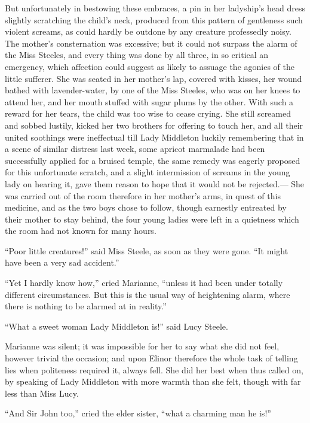 \documentclass{article}
\begin{document}
But unfortunately in bestowing these embraces,
a pin in her ladyship's head dress slightly scratching
the child's neck, produced from this pattern of gentleness
such violent screams, as could hardly be outdone by any
creature professedly noisy.  The mother's consternation
was excessive; but it could not surpass the alarm of the
Miss Steeles, and every thing was done by all three,
in so critical an emergency, which affection could suggest
as likely to assuage the agonies of the little sufferer.
She was seated in her mother's lap, covered with kisses,
her wound bathed with lavender-water, by one of the
Miss Steeles, who was on her knees to attend her,
and her mouth stuffed with sugar plums by the other.
With such a reward for her tears, the child was too wise
to cease crying.  She still screamed and sobbed lustily,
kicked her two brothers for offering to touch her, and all
their united soothings were ineffectual till Lady Middleton
luckily remembering that in a scene of similar distress
last week, some apricot marmalade had been successfully
applied for a bruised temple, the same remedy was eagerly
proposed for this unfortunate scratch, and a slight
intermission of screams in the young lady on hearing it,
gave them reason to hope that it would not be rejected.---%
She was carried out of the room therefore in her
mother's arms, in quest of this medicine, and as the
two boys chose to follow, though earnestly entreated
by their mother to stay behind, the four young ladies
were left in a quietness which the room had not known for
many hours.

``Poor little creatures!'' said Miss Steele, as soon
as they were gone.  ``It might have been a very sad accident.''

``Yet I hardly know how,'' cried Marianne, ``unless it
had been under totally different circumstances.
But this is the usual way of heightening alarm, where there
is nothing to be alarmed at in reality.''

``What a sweet woman Lady Middleton is!'' said Lucy Steele.

Marianne was silent; it was impossible for her to say
what she did not feel, however trivial the occasion;
and upon Elinor therefore the whole task of telling lies
when politeness required it, always fell.  She did her
best when thus called on, by speaking of Lady Middleton
with more warmth than she felt, though with far less than
Miss Lucy.

``And Sir John too,'' cried the elder sister,
``what a charming man he is!''
\end{document}
